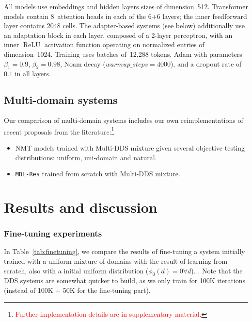 \documentclass[11pt,a4paper]{article}
\newcommand{\fyTodo}[1]{\Todo[FY:]{\textcolor{orange}{#1}}}
\newcommand{\revision}[1]{\textcolor{red}{#1}}
\newcommand{\system}[1]{\texttt{{#1}}}
\begin{document}
All models use embeddings and hidden layers sizes of dimension~512. Transformer models contain 8~attention heads in each of the 6+6 layers; the inner feedforward layer contains 2048 cells. The adapter-based systems (see below) additionally use an adaptation block in each layer, composed of a 2-layer perceptron, with an inner $\operatorname{ReLU}$ activation function operating on normalized entries of dimension~1024. 
Training uses batches of~12,288 tokens, Adam with parameters $\beta_1=0.9$, $\beta_2= 0.98$, Noam decay ($warmup\_steps=4000$), and a dropout rate of $0.1$ in all layers.

\subsection{Multi-domain systems} \label{ssec:mdsys}

Our comparison of multi-domain systems includes our own reimplementations of recent proposals from the literature:\footnote{\revision{Further implementation details are in supplementary material.}}
\begin{itemize}
\itemsep0em 
\item NMT models trained with Multi-DDS mixture given several objective testing distributions: uniform, uni-domain and natural.
\item \system{MDL-Res} trained from scratch with Multi-DDS mixture.
\end{itemize}

\section{Results and discussion \label{sec:results}}


\subsubsection{Fine-tuning experiments}

\fyTodo{Fix the table}
In Table~\ref{tab:finetuning}, we compare the results of fine-tuning a system initially trained with a uniform mixture\fyTodo{uniform or natural?} of domains with the result of learning from scratch, also with a initial uniform distribution ($\phi_0(d) = 0 \forall d$). \fyTodo{What do we see ? How about domain proximity ? - show a graph}. Note that the DDS systems are somewhat quicker to build, as we only train for 100K iterations (instead of 100K + 50K for the fine-tuning part).
\end{document}
